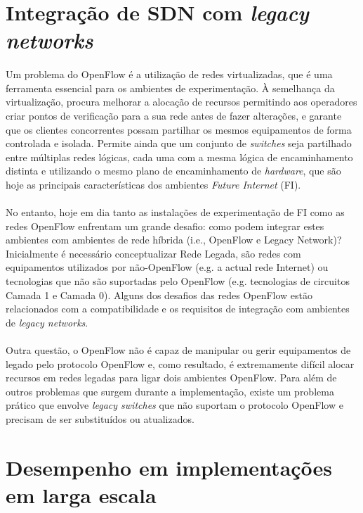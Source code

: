 \documentclass{llncs}
\begin{document}
\section{Integração de SDN com \textit{legacy networks}}
\paragraph{}
Um problema do OpenFlow é a utilização de redes virtualizadas, que é uma ferramenta essencial para os ambientes de experimentação.
À semelhança da virtualização, procura melhorar a alocação de recursos permitindo aos operadores criar pontos de verificação para a sua rede antes de fazer alterações, e garante que os clientes concorrentes possam partilhar os mesmos equipamentos de forma controlada e isolada. 
Permite ainda que um conjunto de \textit{switches} seja partilhado entre múltiplas redes lógicas, cada uma com a mesma lógica de encaminhamento distinta e utilizando o mesmo plano de encaminhamento de \textit{hardware}, que são hoje as principais características dos ambientes \textit{Future Internet} (FI).
\paragraph{}
No entanto, hoje em dia tanto as instalações de experimentação de FI como as redes OpenFlow enfrentam um grande desafio: como podem integrar estes ambientes com ambientes de rede híbrida (i.e., OpenFlow e Legacy Network)? 
Inicialmente é necessário conceptualizar Rede Legada, são redes com equipamentos utilizados por não-OpenFlow (e.g. a actual rede Internet) ou tecnologias que não são suportadas pelo OpenFlow (e.g. tecnologias de circuitos Camada 1 e Camada 0). 
Alguns dos desafios das redes OpenFlow estão relacionados com a compatibilidade e os requisitos de integração com ambientes de \textit{legacy networks}.
\paragraph{}
Outra questão, o OpenFlow não é capaz de manipular ou gerir equipamentos de legado pelo protocolo OpenFlow e, como resultado, é extremamente difícil alocar recursos em redes legadas para ligar dois ambientes OpenFlow. 
Para além de outros problemas que surgem durante a implementação, existe um problema prático que envolve \textit{ legacy switches} que não suportam o protocolo OpenFlow e precisam de ser substituídos ou atualizados.

\section{Desempenho em implementações em larga escala}
\end{document}
